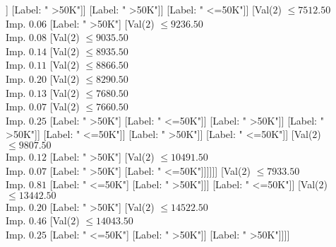 \documentclass[margin=10pt]{standalone}
\begin{document}
\begin{forest}
												[Val($2$) $ \leq 5115.50$ \\ Imp. $0.02$
													[Val($2$) $ \leq 5033.50$ \\ Imp. $0.09$
														[Val($2$) $ \leq 4906.50$ \\ Imp. $0.05$
															[Val($2$) $ \leq 3763.50$ \\ Imp. $0.03$
																[Val($2$) $ \leq 3100.50$ \\ Imp. $0.01$
																	[Label: " <=50K"]
																	[Label: " >50K"]]
																[Label: " >50K"]]
															[Label: " >50K"]]
														[Label: " <=50K"]]
													[Val($2$) $ \leq 7512.50$ \\ Imp. $0.06$
														[Label: " >50K"]
														[Val($2$) $ \leq 9236.50$ \\ Imp. $0.08$
															[Val($2$) $ \leq 9035.50$ \\ Imp. $0.14$
																[Val($2$) $ \leq 8935.50$ \\ Imp. $0.11$
																	[Val($2$) $ \leq 8866.50$ \\ Imp. $0.20$
																		[Val($2$) $ \leq 8290.50$ \\ Imp. $0.13$
																			[Val($2$) $ \leq 7680.50$ \\ Imp. $0.07$
																				[Val($2$) $ \leq 7660.50$ \\ Imp. $0.25$
																					[Label: " >50K"]
																					[Label: " <=50K"]]
																				[Label: " >50K"]]
																			[Label: " >50K"]]
																		[Label: " <=50K"]]
																	[Label: " >50K"]]
																[Label: " <=50K"]]
															[Val($2$) $ \leq 9807.50$ \\ Imp. $0.12$
																[Label: " >50K"]
																[Val($2$) $ \leq 10491.50$ \\ Imp. $0.07$
																	[Label: " >50K"]
																	[Label: " <=50K"]]]]]]
												[Val($2$) $ \leq 7933.50$ \\ Imp. $0.81$
													[Label: " <=50K"]
													[Label: " >50K"]]]
											[Label: " <=50K"]]
										[Val($2$) $ \leq 13442.50$ \\ Imp. $0.20$
											[Label: " >50K"]
											[Val($2$) $ \leq 14522.50$ \\ Imp. $0.46$
												[Val($2$) $ \leq 14043.50$ \\ Imp. $0.25$
													[Label: " <=50K"]
													[Label: " >50K"]]
												[Label: " >50K"]]]]

\end{forest}
\end{document}
